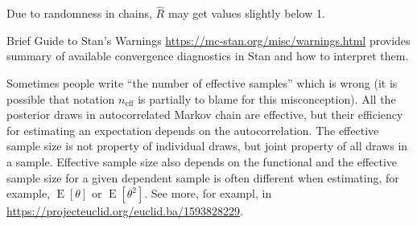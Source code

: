 \documentclass[a4paper,11pt,english]{article}
\DeclareMathOperator{\E}{E}
\def\eff{\mathrm{eff}}
\begin{document}
Due to randomness in chains, $\hat{R}$ may get values slightly below 1.

Brief Guide to Stan's Warnings
\url{https://mc-stan.org/misc/warnings.html} provides summary of
available convergence diagnostics in Stan and how to interpret them.

Sometimes people write ``the number of effective samples'' which is wrong (it is possible that notation $n_\eff$ is partially to blame for this misconception). All the posterior draws in autocorrelated Markov chain are effective, but their efficiency for estimating an expectation depends on the autocorrelation. The effective sample size is not property of individual draws, but joint property of all draws in a sample. Effective sample size also depends on the functional and the effective sample size for a given dependent sample is often different when estimating, for example, $\E[\theta]$ or $\E[\theta^2]$. See more, for exampl, in \url{https://projecteuclid.org/euclid.ba/1593828229}.
\end{document}
